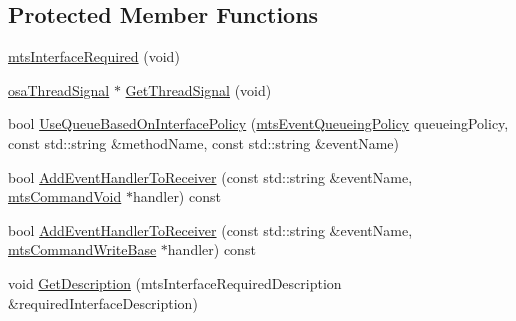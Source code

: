 \subsection*{Protected Member Functions}
\begin{DoxyCompactItemize}
\item 
\hyperlink{classmts_interface_required_a3394011d351fabdfa7f341f0e6ac36bb}{mts\+Interface\+Required} (void)
\item 
\hyperlink{classosa_thread_signal}{osa\+Thread\+Signal} $\ast$ \hyperlink{classmts_interface_required_a00d93a0e2b605cfbd6251a4c29571bc7}{Get\+Thread\+Signal} (void)
\item 
bool \hyperlink{classmts_interface_required_a4a8befde3210e2786e915a16f6ecf2c7}{Use\+Queue\+Based\+On\+Interface\+Policy} (\hyperlink{mts_forward_declarations_8h_a9286ac2ca46e5bcd57059550faa96916}{mts\+Event\+Queueing\+Policy} queueing\+Policy, const std\+::string \&method\+Name, const std\+::string \&event\+Name)
\item 
bool \hyperlink{classmts_interface_required_a874737df36144428d0543bf3fdcbf079}{Add\+Event\+Handler\+To\+Receiver} (const std\+::string \&event\+Name, \hyperlink{classmts_command_void}{mts\+Command\+Void} $\ast$handler) const 
\item 
bool \hyperlink{classmts_interface_required_a59745eecdc6ee2dedd5779cff379bfed}{Add\+Event\+Handler\+To\+Receiver} (const std\+::string \&event\+Name, \hyperlink{classmts_command_write_base}{mts\+Command\+Write\+Base} $\ast$handler) const 
\item 
void \hyperlink{classmts_interface_required_abc1c41cecdfa6d2970bafd9bd11d57ed}{Get\+Description} (mts\+Interface\+Required\+Description \&required\+Interface\+Description)
\end{DoxyCompactItemize}
